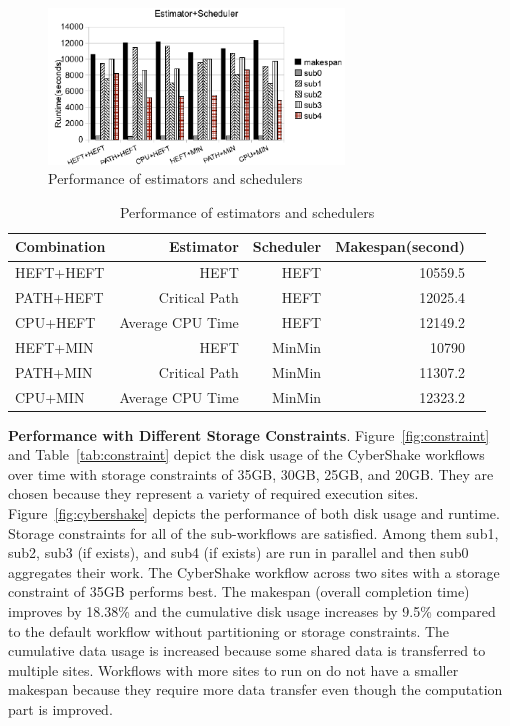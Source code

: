 \begin{figure}[h!]
	\centering
    \includegraphics[width=0.7\textwidth]{figures/partitioning/scheduler.pdf}
    \caption{Performance of estimators and schedulers}
    \label{fig:scheduler}
\end{figure}

\begin{table}[h!]
\caption{Performance of estimators and schedulers}
\label{tab:scheduler}
\centering
\begin{tabular}{lrrrr}
\hline
Combination     &     Estimator &     Scheduler &    Makespan(second)  \\
\hline
HEFT+HEFT & HEFT & HEFT & 10559.5\\
PATH+HEFT & Critical Path & HEFT & 12025.4\\
CPU+HEFT & Average CPU Time & HEFT & 12149.2\\
HEFT+MIN & HEFT & MinMin & 10790 \\
PATH+MIN & Critical Path & MinMin & 11307.2 \\
CPU+MIN & Average CPU Time & MinMin & 12323.2\\
\hline
\end{tabular}
\end{table} 

\textbf{Performance with Different Storage Constraints}. Figure~\ref{fig:constraint} and Table~\ref{tab:constraint} depict the disk usage of the CyberShake workflows over time with storage constraints of 35GB, 30GB, 25GB, and 20GB. They are chosen because they represent a variety of required execution sites. Figure~\ref{fig:cybershake} depicts the performance of both disk usage and runtime. Storage constraints for all of the sub-workflows are satisfied. Among them sub1, sub2, sub3 (if exists), and sub4 (if exists) are run in parallel and then sub0 aggregates their work. The CyberShake workflow across two sites with a storage constraint of 35GB performs best. The makespan (overall completion time) improves by 18.38\% and the cumulative disk usage increases by 9.5\% compared to the default workflow without partitioning or storage constraints. The cumulative data usage is increased because some shared data is transferred to multiple sites. Workflows with more sites to run on do not have a smaller makespan because they require more data transfer even though the computation part is improved. 

